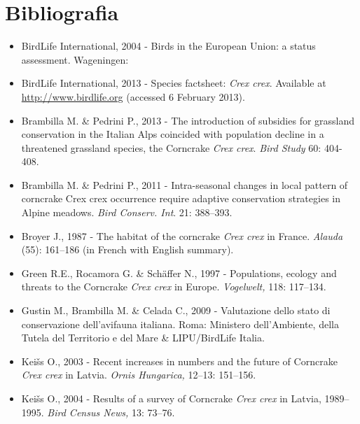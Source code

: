 \section*{Bibliografia}
\begin{itemize}\itemsep0pt
	\item BirdLife International, 2004 - Birds in the European Union: a status
assessment. Wageningen: 

	\item BirdLife International, 2013 - Species factsheet: \textit{Crex crex}.
Available at \href{http://www.birdlife.org}{http:\allowbreak //www.\allowbreak bird\allowbreak li\allowbreak fe.\allowbreak org} (accessed 6 February 2013).

	\item Brambilla M. \& Pedrini P., 2013 - The introduction of subsidies for
grassland conservation in the Italian Alps coincided with population
decline in a threatened grassland species, the Corncrake \textit{Crex
crex}. \textit{Bird Study} 60: 404-408.

	\item Brambilla M. \& Pedrini P., 2011 - Intra-seasonal changes in local
pattern of corncrake Crex crex occurrence require adaptive conservation
strategies in Alpine meadows. \textit{Bird Conserv. Int}. 21:
388{}--393.

	\item Broyer J., 1987 - The habitat of the corncrake \textit{Crex crex} in
France. \textit{Alauda} (55): 161--186 (in French with English
summary). 

	\item Green R.E., Rocamora G. \& Sch\"affer N., 1997 - Populations, ecology
and threats to the Corncrake \textit{Crex crex }in Europe.
\textit{Vogelwelt, }118: 117{}--134.

	\item Gustin M., Brambilla M. \& Celada C., 2009 - Valutazione dello stato di
conservazione dell{\textquoteright}avifauna italiana. Roma: Ministero
dell{\textquoteright}Ambiente, della Tutela del Territorio e del Mare
\& LIPU/BirdLife Italia.

	\item Kei\v{s}s O., 2003 - Recent increases in numbers and the future of
Corncrake \textit{Crex crex} in Latvia. \textit{Ornis Hungarica,}
12{}--13: 151{}--156.

	\item Kei\v{s}s O., 2004 - Results of a survey of Corncrake \textit{Crex crex}
in Latvia, 1989{}--1995. \textit{Bird Census News,} 13: 73{}--76.


\end{itemize}
